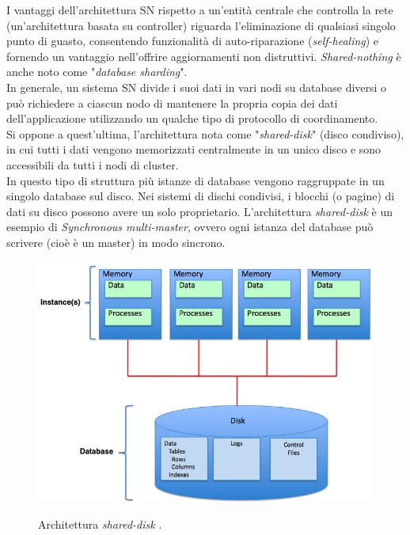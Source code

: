 I vantaggi dell'architettura SN rispetto a un'entit\`{a} centrale che controlla la rete (un'architettura basata su controller) riguarda l'eliminazione di qualsiasi singolo punto di guasto, consentendo funzionalit\`{a} di auto-riparazione (\textit{self-healing}) e fornendo un vantaggio nell'offrire aggiornamenti non distruttivi\cite{etichetta6}. 
\textit{Shared-nothing} \`{e} anche noto come "\textit{database sharding}". \\
In generale, un sistema SN divide i suoi dati in vari nodi su database diversi o pu\`{o} richiedere a ciascun nodo di mantenere la propria copia dei dati dell'applicazione utilizzando un qualche tipo di protocollo di coordinamento\cite{etichetta5}.\\


Si oppone a quest'ultima, l'architettura nota come "\textit{shared-disk}" (disco condiviso), in cui tutti i dati vengono memorizzati centralmente in un unico disco e sono accessibili da tutti i nodi di cluster\cite{etichetta7}.\\
In questo tipo di struttura pi\`{u} istanze di database vengono raggruppate in un singolo database sul disco. Nei sistemi di dischi condivisi, i blocchi (o pagine) di dati su disco possono avere un solo proprietario.
L'architettura \textit{shared-disk} \`{e} un esempio di \textit{Synchronous multi-master}, ovvero ogni istanza del database pu\`{o} scrivere (cio\`{e} \`{e} un master) in modo sincrono\cite{etichetta7}.

\begin{figure}[htbp]
\centering
\includegraphics[scale=0.50]{img/Shared_Disk_Architecture.jpg}\\
\caption{Architettura \textit{shared-disk} \cite{etichetta7}.}
\label{fig:Shared_Disk_Architecture}
\end{figure}
\\


